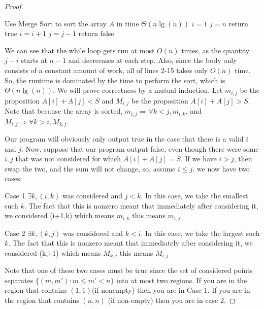 \documentclass{article}
\begin{document}
\begin{proof}
\begin{algorithm} \begin{algorithmic}[1]
 \State Use Merge Sort to sort the array $A$ in time $\Theta(n\lg(n))$
\State $i=1$
\State $j = n$
 \State return true
 \EndIf
 \State $ i = i+1$
 \EndIf 
 \State $ j = j-1$
 \EndIf 
 \EndWhile
 \State return false
 \end{algorithmic}
\end{algorithm}
We can see that the while loop gets run at most $O(n)$ times, as the quantity $j-i$ starts at $n-1$ and decreeases at each step. Also, since the body only consists of a constant amount of work, all of lines 2-15 takes only $O(n)$ time. So, the runtime is dominated by the time to perform the sort, which is $\Theta(n\lg(n))$. We will prove correctness by a mutual induction. Let $m_{i,j}$ be the proposition $A[i]+A[j]<S$ and $M_{i,j}$ be the proposition $A[i]+A[j]>S$. Note that because the array is sorted, $m_{i,j} \Rightarrow \forall k<j, m_{i,k}$, and $M_{i,j} \Rightarrow \forall k>i, M_{k,j}$. 

Our program will obviously only output true in the case that there is a valid $i$ and $j$. Now, suppose that our program output false, even though there were some $i,j$ that was not considered for which $A[i]+A[j]=S$. If we have $i>j$, then swap the two, and the sum will not change, so, assume $i\le j$. we now have two cases:

Case 1 $\exists k, (i,k)$ was considered and $j<k$. In this case, we take the smallest such $k$. The fact that this is nonzero meant that immediately after considering it, we considered (i+1,k) which means $m_{i,k}$ this means $m_{i,j}$

Case 2 $\exists k, (k,j)$ was considered and $k<i$. In this case, we take the largest such $k$. The fact that this is nonzero meant that immediately after considering it, we considered (k,j-1) which means $M_{k,j}$ this means $M_{i,j}$

Note that one of these two cases must be true since the set of considered points separates $\{(m,m'): m\le m'<n\}$ into at most two regions. If you are in the region that contains $(1,1)$(if nonempty) then you are in Case 1. If you are in the region that contains $(n,n)$ (if non-empty) then you are in case 2.
\end{proof}
\end{document}
